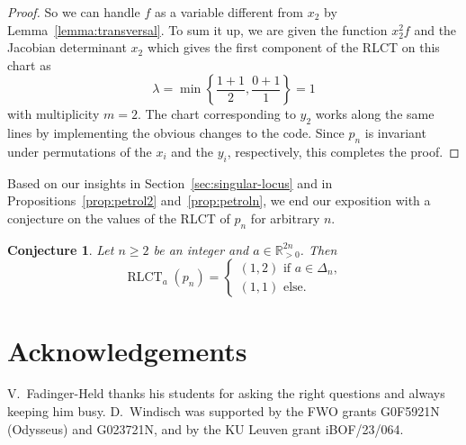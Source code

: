 \documentclass[11pt]{amsart}
\DeclareMathOperator{\rlct}{RLCT}
\numberwithin{equation}{section}
\theoremstyle{plain}
\newtheorem{conj}[theorem]{Conjecture}
\theoremstyle{definition}
\newcommand{\R}{\mathbb{R}}
\newcommand{\gt}{>}
\begin{document}
\begin{proof}
So we can handle $f$ as a variable different from $x_2$ by Lemma~\ref{lemma:transversal}. To sum it up, we are given the function $x_2^2f$ and the Jacobian determinant $x_2$ which gives the first component of the RLCT on this chart as
\[
\lambda = \min \left\{ \frac{1+1}{2}, \frac{0+1}{1}  \right\} = 1
\]
with multiplicity $m = 2$. The chart corresponding to $y_2$ works along the same lines by implementing the obvious changes to the code. Since $p_n$ is invariant under permutations of the $x_i$ and the $y_i$, respectively, this completes the proof.
\end{proof}

Based on our insights in Section~\ref{sec:singular-locus} and in Propositions~\ref{prop:petrol2} and~\ref{prop:petroln}, we end our exposition with a conjecture on the values of the RLCT of $p_n$ for arbitrary $n$.


\begin{conj}
    Let $n \geq 2$ be an integer and $a \in \R_{\gt 0}^{2n}$. Then
    \[
    \rlct_a(p_n) = \begin{cases}
        (1,2) \text{ if } a \in \Delta_n, \\
        (1,1) \text{ else}.
    \end{cases}
    \]
\end{conj}


\section*{Acknowledgements}
V.~Fadinger-Held thanks his students for asking the right questions and always keeping him busy.
 D.~Windisch was supported by the FWO grants G0F5921N (Odysseus) and G023721N, and by the KU Leuven grant iBOF/23/064.






   
\end{document}
